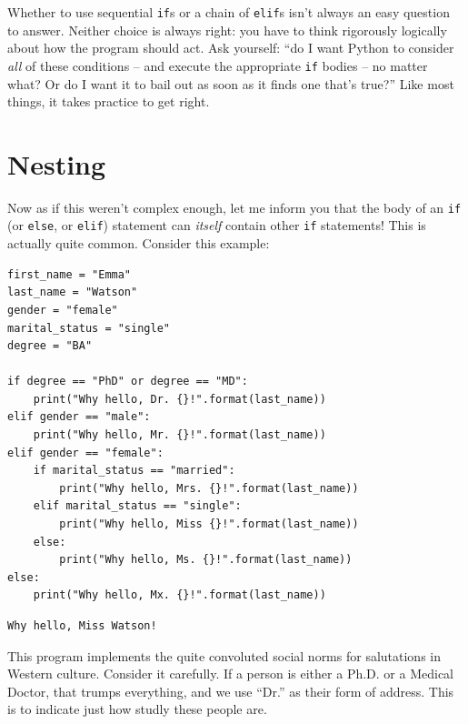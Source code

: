 Whether to use sequential \texttt{if}s or a chain of \texttt{elif}s isn't
always an easy question to answer. Neither choice is always right: you have to
think rigorously logically about how the program should act. Ask yourself: ``do
I want Python to consider \textit{all} of these conditions -- and execute the
appropriate \texttt{if} bodies -- no matter what? Or do I want it to bail out
as soon as it finds one that's true?'' Like most things, it takes practice to
get right.

\section{Nesting}


Now as if this weren't complex enough, let me inform you that the body of an
\texttt{if} (or \texttt{else}, or \texttt{elif}) statement can \textit{itself}
contain other \texttt{if} statements! This is actually quite common. Consider
this example:

\label{salutation}

\begin{Verbatim}[fontsize=\small,samepage=true,frame=single,framesep=3mm]
first_name = "Emma"
last_name = "Watson"
gender = "female"
marital_status = "single"
degree = "BA"

if degree == "PhD" or degree == "MD":
    print("Why hello, Dr. {}!".format(last_name))
elif gender == "male":
    print("Why hello, Mr. {}!".format(last_name))
elif gender == "female":
    if marital_status == "married":
        print("Why hello, Mrs. {}!".format(last_name))
    elif marital_status == "single":
        print("Why hello, Miss {}!".format(last_name))
    else:
        print("Why hello, Ms. {}!".format(last_name))
else:
    print("Why hello, Mx. {}!".format(last_name))
\end{Verbatim}
\vspace{-.2in}

\begin{Verbatim}[fontsize=\small,samepage=true,frame=leftline,framesep=5mm,framerule=1mm]
Why hello, Miss Watson!
\end{Verbatim}

This program implements the quite convoluted social norms for salutations in
Western culture. Consider it carefully. If a person is either a Ph.D. or a
Medical Doctor, that trumps everything, and we use ``Dr.'' as their form of
address. This is to indicate just how studly these people are.

